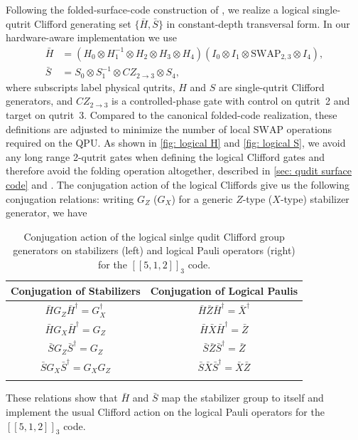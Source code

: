 Following the folded-surface-code construction of
\cite{Moussa2016}, we realize a logical single-qutrit Clifford generating set $\{\bar H,\bar S\}$ in constant-depth transversal form. In our hardware-aware
implementation we use
\begin{align}
  \bar H &=
  (H_0 \otimes H_1^{-1} \otimes H_2 \otimes H_3 \otimes H_4)
  (I_0 \otimes I_1 \otimes \mathrm{SWAP}_{2,3} \otimes I_4), \\
  \bar S &= S_0 \otimes S_1^{-1} \otimes CZ_{2\rightarrow 3} \otimes S_4,
\end{align}
where subscripts label physical qutrits, $H$ and $S$ are single-qutrit Clifford generators, and $CZ_{2\rightarrow 3}$ is a controlled-phase gate with control on qutrit~2 and target on qutrit~3. Compared to the canonical folded-code realization, these definitions are adjusted to minimize the number of local $\mathrm{SWAP}$ operations required on the QPU. As shown in \autoref{fig: logical H} and \autoref{fig: logical S}, we avoid any long range 2-qutrit gates when defining the logical Clifford gates and therefore avoid the folding operation altogether, described in \autoref{sec: qudit surface code} and \cite{Moussa2016}. The conjugation action of the logical Cliffords give us the following conjugation relations: writing $G_Z$ ($G_X$) for a generic $Z$-type ($X$-type) stabilizer generator, we have
\begin{table}[H]
  \centering
  \label{tab:clifford-conjugation}
  \begin{tabular}{c|c}
    \hline
    Conjugation of Stabilizers
      & Conjugation of Logical Paulis\\
    \hline
    $\bar H G_Z \bar H^\dagger = G_X^\dagger$
      & $\bar H \bar Z \bar H^\dagger = \bar X^\dagger$ \\
    $\bar H G_X \bar H^\dagger = G_Z$
      & $\bar H \bar X \bar H^\dagger = \bar Z$ \\
    $\bar S G_Z \bar S^\dagger = G_Z$
      & $\bar S \bar Z \bar S^\dagger = \bar Z$ \\
    $\bar S G_X \bar S^\dagger = G_X G_Z$
      & $\bar S \bar X \bar S^\dagger = \bar X \bar Z$ \\
    \hline
    \label{tab:clifford-conjugation}
  \end{tabular}
  \caption{Conjugation action of the logical sinlge qudit Clifford group generators on
  stabilizers (left) and logical Pauli operators (right) for the  $[[5,1,2]]_3$ code.}
\end{table}
These relations show that $\bar H$ and $\bar S$ map the stabilizer group to itself and implement the usual Clifford action on the logical Pauli operators for the $[[5,1,2]]_3$ code.

